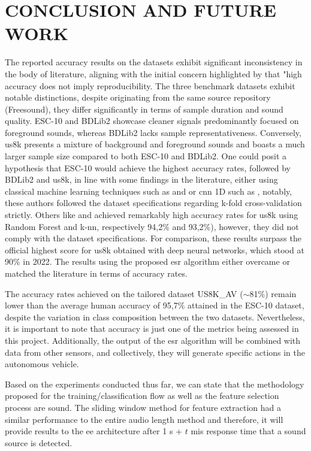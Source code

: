 \chapter{CONCLUSION AND FUTURE WORK}
\label{chp:conclusion}


The reported accuracy results on the datasets exhibit significant inconsistency in the body of literature, aligning with the initial concern highlighted by \textcite{Ho2020} that "high accuracy does not imply reproducibility. The three benchmark datasets exhibit notable distinctions, despite originating from the same source repository (Freesound), they differ significantly in terms of sample duration and sound quality. ESC-10 and BDLib2 showcase cleaner signals predominantly focused on foreground sounds, whereas BDLib2 lacks sample representativeness. Conversely, \gls{us8k} presents a mixture of background and foreground sounds and boasts a much larger sample size compared to both ESC-10 and BDLib2. One could posit a hypothesis that ESC-10 would achieve the highest accuracy rates, followed by BDLib2 and \gls{us8k}, in line with some findings in the literature, either using classical machine learning techniques such as \cite{Silva2019} and \cite{Bountourakis2019} or \gls{cnn} 1D such as \cite{Vandendriessche2021}, notably, these authors followed the dataset specifications regarding k-fold cross-validation strictly. Others like \cite{Lhoest2021} and \cite{Luz2021} achieved remarkably high accuracy rates for \gls{us8k} using Random Forest and \gls{k-nn}, respectively 94,2\% and 93,2\%), however, they did not comply with the dataset specifications. For comparison, these results surpass the official highest score for \gls{us8k} obtained with deep neural networks, which stood at 90\% in 2022. The results using the proposed \gls{esr} algorithm either overcame or matched the literature in terms of accuracy rates.


The accuracy rates achieved on the tailored dataset US8K\_AV ($\sim$81\%) remain lower than the average human accuracy of 95,7\% attained in the ESC-10 dataset, despite the variation in class composition between the two datasets. Nevertheless, it is important to note that accuracy is just one of the metrics being assessed in this project. Additionally, the output of the \gls{esr} algorithm will be combined with data from other sensors, and collectively, they will generate specific actions in the autonomous vehicle.


Based on the experiments conducted thus far, we can state that the methodology proposed for the training/classification flow as well as the feature selection process are sound. The sliding window method for feature extraction had a similar performance to the entire audio length method and therefore, it will provide results to the \gls{ee} architecture after 1 \gls{s} + $t$ \gls{mi}\gls{s} response time that a sound source is detected.


